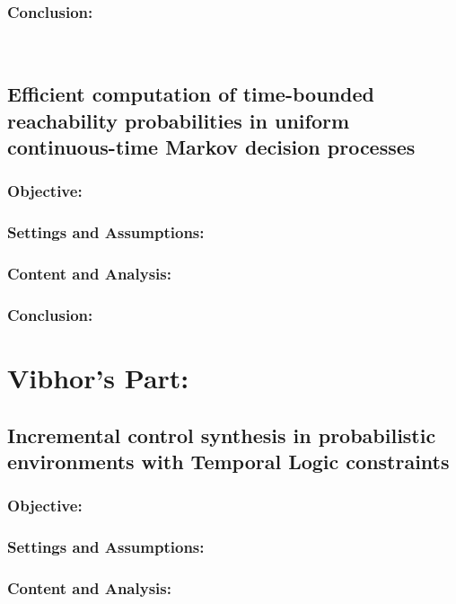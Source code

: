 \documentclass{article}
\theoremstyle{definition}
\begin{document}
\subsubsection{Conclusion:}

\\
\subsection{Efficient
computation of time-bounded reachability probabilities in uniform
continuous-time Markov decision processes}
\subsubsection{Objective:}

\subsubsection{Settings and Assumptions:}

\subsubsection{Content and Analysis:}

\subsubsection{Conclusion:}


\section{Vibhor's Part:}
\subsection{ Incremental control synthesis in probabilistic environments with Temporal Logic constraints}
\subsubsection{Objective:}

\subsubsection{Settings and Assumptions:}

\subsubsection{Content and Analysis:}
\end{document}
